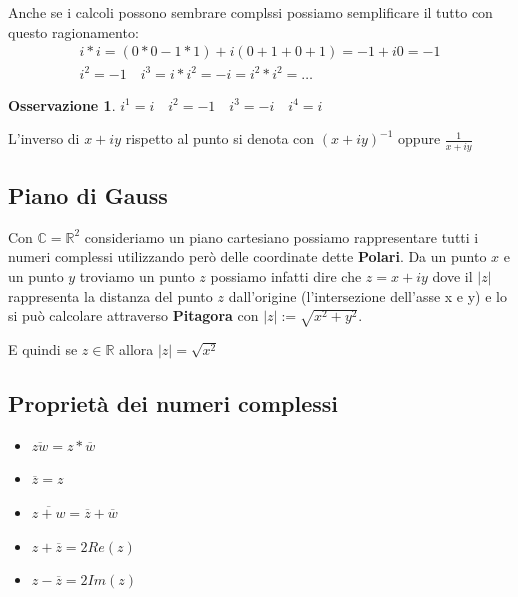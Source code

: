 \documentclass{article}
\theoremstyle{definition}
\newtheorem{oss}{Osservazione}[section]
\begin{document}
Anche se i calcoli possono sembrare complssi possiamo semplificare il tutto con questo ragionamento:
\begin{align*}
        i * i = (0*0 - 1*1) + i(0+1 + 0+1) = -1+ i0 = -1 \\
        i^2 = -1 \quad i^3 = i * i^2 = -i = i^2 * i^2 = \ldots 
\end{align*}

\begin{tcolorbox}
\begin{oss}
        $\boxed{ i^1 = i \quad i^2 = -1 \quad i^3 = -i \quad i^4 = i}$
\end{oss}
\end{tcolorbox}

L'inverso di $x + iy$ rispetto al punto si denota con ${(x + iy)}^{-1}$ oppure $\frac{1}{x + iy}$



\subsection{Piano di Gauss}
Con $\mathbb{C} = \mathbb{R}^2$ consideriamo un piano cartesiano possiamo rappresentare tutti i numeri complessi utilizzando però delle coordinate dette \textbf{Polari}.
Da un punto $x$ e un punto $y$ troviamo un punto $z$ possiamo infatti dire che $z = x+iy$ dove il $|z|$  rappresenta la distanza del punto $z$ dall'origine (l'intersezione dell'asse x e y) e lo si può calcolare attraverso \textbf{Pitagora} con $|z| := \sqrt{x^2+y^2}$. \par
E quindi se $z \in \mathbb{R}$ allora $|z| = \sqrt{x^2}$


\subsection{Proprietà dei numeri complessi}
\begin{itemize}
        \item $\overline{zw} = z * \overline{w}$ \\
        \item $\overline{z} = z$ \\
        \item $\overline{z+w} = \overline{z} + \overline{w}$ \\
        \item $z+\overline{z}=2Re(z)$ \\
        \item $z - \overline{z}=2Im(z)$ \\
\end{itemize}
\end{document}
